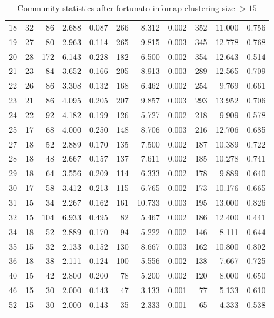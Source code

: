 \begin{table}[ht]
\begin{adjustbox}{max width=\textwidth}
\begin{tabular}{lrrrrrrrrrr}
  18 & 32 & 86 & 2.688 & 0.087 & 266 & 8.312 & 0.002 & 352 & 11.000 & 0.756 \\ 
  19 & 27 & 80 & 2.963 & 0.114 & 265 & 9.815 & 0.003 & 345 & 12.778 & 0.768 \\ 
  20 & 28 & 172 & 6.143 & 0.228 & 182 & 6.500 & 0.002 & 354 & 12.643 & 0.514 \\ 
  21 & 23 & 84 & 3.652 & 0.166 & 205 & 8.913 & 0.003 & 289 & 12.565 & 0.709 \\ 
  22 & 26 & 86 & 3.308 & 0.132 & 168 & 6.462 & 0.002 & 254 & 9.769 & 0.661 \\ 
  23 & 21 & 86 & 4.095 & 0.205 & 207 & 9.857 & 0.003 & 293 & 13.952 & 0.706 \\ 
  24 & 22 & 92 & 4.182 & 0.199 & 126 & 5.727 & 0.002 & 218 & 9.909 & 0.578 \\ 
  25 & 17 & 68 & 4.000 & 0.250 & 148 & 8.706 & 0.003 & 216 & 12.706 & 0.685 \\ 
  27 & 18 & 52 & 2.889 & 0.170 & 135 & 7.500 & 0.002 & 187 & 10.389 & 0.722 \\ 
  28 & 18 & 48 & 2.667 & 0.157 & 137 & 7.611 & 0.002 & 185 & 10.278 & 0.741 \\ 
  29 & 18 & 64 & 3.556 & 0.209 & 114 & 6.333 & 0.002 & 178 & 9.889 & 0.640 \\ 
  30 & 17 & 58 & 3.412 & 0.213 & 115 & 6.765 & 0.002 & 173 & 10.176 & 0.665 \\ 
  31 & 15 & 34 & 2.267 & 0.162 & 161 & 10.733 & 0.003 & 195 & 13.000 & 0.826 \\ 
  32 & 15 & 104 & 6.933 & 0.495 & 82 & 5.467 & 0.002 & 186 & 12.400 & 0.441 \\ 
  34 & 18 & 52 & 2.889 & 0.170 & 94 & 5.222 & 0.002 & 146 & 8.111 & 0.644 \\ 
   35 & 15 & 32 & 2.133 & 0.152 & 130 & 8.667 & 0.003 & 162 & 10.800 & 0.802 \\ 
  36 & 18 & 38 & 2.111 & 0.124 & 100 & 5.556 & 0.002 & 138 & 7.667 & 0.725 \\ 
  40 & 15 & 42 & 2.800 & 0.200 & 78 & 5.200 & 0.002 & 120 & 8.000 & 0.650 \\ 
  46 & 15 & 30 & 2.000 & 0.143 & 47 & 3.133 & 0.001 & 77 & 5.133 & 0.610 \\ 
  52 & 15 & 30 & 2.000 & 0.143 & 35 & 2.333 & 0.001 & 65 & 4.333 & 0.538 \\ 
   \hline
\end{tabular}
\end{adjustbox}
\caption{Community statistics after fortunato infomap clustering size $> 15$} 
\label{tab:Community statistics after fortunato infomap clustering size > 15}
\end{table}
